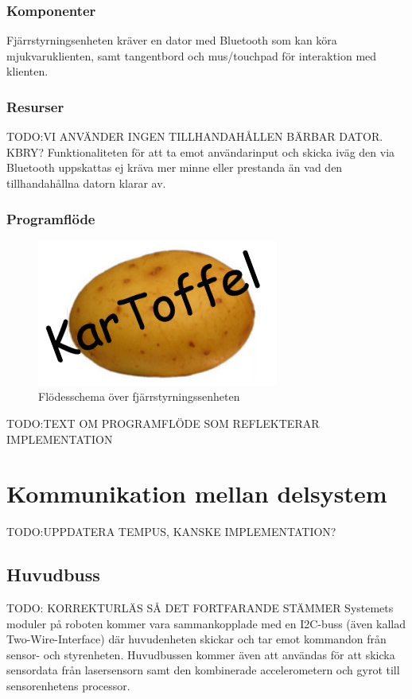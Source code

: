 \documentclass{article}
\begin{document}
\subsubsection{Komponenter}
Fjärrstyrningsenheten kräver en dator med Bluetooth som kan köra mjukvaruklienten, samt tangentbord och mus/touchpad för interaktion med klienten. 

\subsubsection{Resurser}
TODO:VI ANVÄNDER INGEN TILLHANDAHÅLLEN BÄRBAR DATOR. KBRY?
Funktionaliteten för att ta emot användarinput och skicka iväg den via Bluetooth uppskattas ej kräva mer minne eller prestanda än vad den tillhandahållna datorn klarar av.


\subsubsection{Programflöde}
\begin{figure}[H]
\centering 
\includegraphics[scale=0.3]{Logo}
\caption{Flödesschema över fjärrstyrningssenheten}
\label{fig:Fjarrstyrningsenhet_flowchart3}
\end{figure}

TODO:TEXT OM PROGRAMFLÖDE SOM REFLEKTERAR IMPLEMENTATION

\section{Kommunikation mellan delsystem}
\label{sec:kommunikation_mellan_delsystem}
TODO:UPPDATERA TEMPUS, KANSKE IMPLEMENTATION?

\subsection{Huvudbuss}
TODO: KORREKTURLÄS SÅ DET FORTFARANDE STÄMMER 
Systemets moduler på roboten kommer vara sammankopplade med en I2C-buss (även kallad Two-Wire-Interface) där huvudenheten skickar och tar emot kommandon från sensor- och styrenheten. Huvudbussen kommer även att användas för att skicka sensordata från lasersensorn samt den kombinerade accelerometern och gyrot till sensorenhetens processor.
\end{document}
